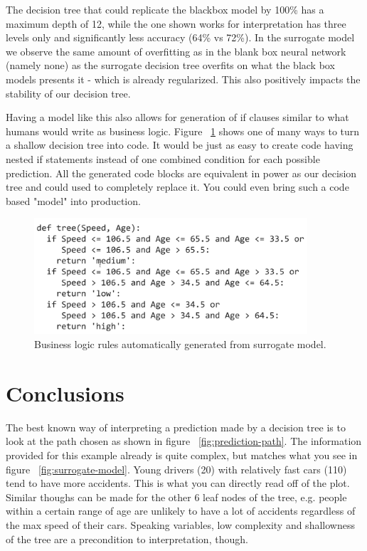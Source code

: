 \documentclass{article} %
\begin{document}
The decision tree that could replicate the blackbox model by 100\% has a maximum depth of 12, while the one shown works for interpretation has three levels only and significantly less accuracy (64\% vs 72\%). In the surrogate model we observe the same amount of overfitting as in the blank box neural network (namely none) as the surrogate decision tree overfits on what the black box models presents it - which is already regularized. This also positively impacts the stability of our decision tree.

Having a model like this also allows for generation of if clauses similar to what humans would write as business logic. Figure ~\ref{fig:rules} shows one of many ways to turn a shallow decision tree into code. It would be just as easy to create code having nested if statements instead of one combined condition for each possible prediction. All the generated code blocks are equivalent in power as our decision tree and could used to completely replace it. You could even bring such a code based "model" into production.

\begin{figure}[h]
\begin{center}
\includegraphics[width=4.0in]{code.png}
\end{center}
\caption{Business logic rules automatically generated from surrogate model.}
\label{fig:rules}
\end{figure}

\section{Conclusions}

The best known way of interpreting a prediction made by a decision tree is to look at the path chosen as shown in figure ~\ref{fig:prediction-path}. The information provided for this example already is quite complex, but matches what you see in figure ~\ref{fig:surrogate-model}. Young drivers (20) with relatively fast cars (110) tend to have more accidents. This is what you can directly read off of the plot. Similar thoughs can be made for the other 6 leaf nodes of the tree, e.g. people within a certain range of age are unlikely to have a lot of accidents regardless of the max speed of their cars. Speaking variables, low complexity and shallowness of the tree are a precondition to interpretation, though.
\end{document}

